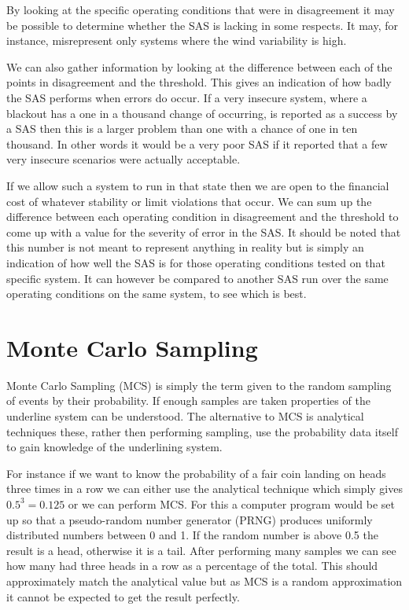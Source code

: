 \documentclass[a4paper,oneside,12pt]{report}
\newenvironment{vivacorrections}
{}
{}
\begin{document}
By looking at the specific operating conditions that were in disagreement it may be possible to determine whether the SAS is lacking in some respects. It may, for instance, misrepresent only systems where the wind variability is high.

\begin{vivacorrections}

We can also gather information by looking at the difference between each of the points in disagreement and the threshold. This gives an indication of how badly the SAS performs when errors do occur. If a very insecure system, where a blackout has a one in a thousand change of occurring, is reported as a success by a SAS then this is a larger problem than one with a chance of one in ten thousand. In other words it would be a very poor SAS if it reported that a few very insecure scenarios were actually acceptable. 

If we allow such a system to run in that state then we are open to the financial cost of whatever stability or limit violations that occur. We can sum up the difference between each operating condition in disagreement and the threshold to come up with a value for the severity of error in the SAS. It should be noted that this number is not meant to represent anything in reality but is simply an indication of how well the SAS is for those operating conditions tested on that specific system. It can however be compared to another SAS run over the same operating conditions on the same system, to see which is best.

\end{vivacorrections}

\section{Monte Carlo Sampling}\label{lbl_sec_mcs}

Monte Carlo Sampling (MCS) is simply the term given to the random sampling of events by their probability. If enough samples are taken properties of the underline system can be understood. The alternative to MCS is analytical techniques these, rather then performing sampling, use the probability data itself to gain knowledge of the underlining system.

For instance if we want to know the probability of a fair coin landing on heads three times in a row we can either use the analytical technique which simply gives $0.5^3 = 0.125$ or we can perform MCS. For this a computer program would be set up so that a pseudo-random number generator (PRNG) produces uniformly distributed numbers between 0 and 1. If the random number is above 0.5 the result is a head, otherwise it is a tail. After performing many samples we can see how many had three heads in a row as a percentage of the total. This should approximately match the analytical value but as MCS is a random approximation it cannot be expected to get the result perfectly.
\end{document}
